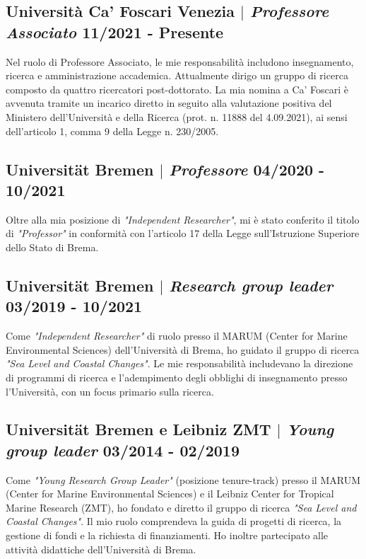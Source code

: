 \documentclass[11pt]{article}
\begin{document}
\bigskip
\subsection{Università Ca' Foscari Venezia $|$ {\normalfont\textit{Professore Associato}} \hfill 11/2021 - Presente}
{\footnotesize Nel ruolo di Professore Associato, le mie responsabilità includono insegnamento, ricerca e amministrazione accademica. Attualmente dirigo un gruppo di ricerca composto da quattro ricercatori post-dottorato. La mia nomina a Ca' Foscari è avvenuta tramite un incarico diretto in seguito alla valutazione positiva del Ministero dell'Università e della Ricerca (prot. n. 11888 del 4.09.2021), ai sensi dell'articolo 1, comma 9 della Legge n. 230/2005.}

\bigskip

\subsection{Universität Bremen $|$ {\normalfont\textit{Professore}} \hfill 04/2020 - 10/2021}
{\footnotesize Oltre alla mia posizione di \textit{"Independent Researcher"}, mi è stato conferito il titolo di \textit{"Professor"} in conformità con l'articolo 17 della Legge sull'Istruzione Superiore dello Stato di Brema.}
\bigskip

\subsection{Universität Bremen $|$ {\normalfont\textit{Research group leader}} \hfill 03/2019 - 10/2021}
{\footnotesize Come \textit{"Independent Researcher"} di ruolo presso il MARUM (Center for Marine Environmental Sciences) dell'Università di Brema, ho guidato il gruppo di ricerca \textit{"Sea Level and Coastal Changes"}. Le mie responsabilità includevano la direzione di programmi di ricerca e l'adempimento degli obblighi di insegnamento presso l'Università, con un focus primario sulla ricerca.}
\bigskip

\subsection{Universität Bremen e Leibniz ZMT $|$ {\normalfont\textit{Young group leader}} \hfill 03/2014 - 02/2019}
{\footnotesize Come \textit{"Young Research Group Leader"} (posizione tenure-track) presso il MARUM (Center for Marine Environmental Sciences) e il Leibniz Center for Tropical Marine Research (ZMT), ho fondato e diretto il gruppo di ricerca \textit{"Sea Level and Coastal Changes"}. Il mio ruolo comprendeva la guida di progetti di ricerca, la gestione di fondi e la richiesta di finanziamenti. Ho inoltre partecipato alle attività didattiche dell'Università di Brema.}
\bigskip
\end{document}
